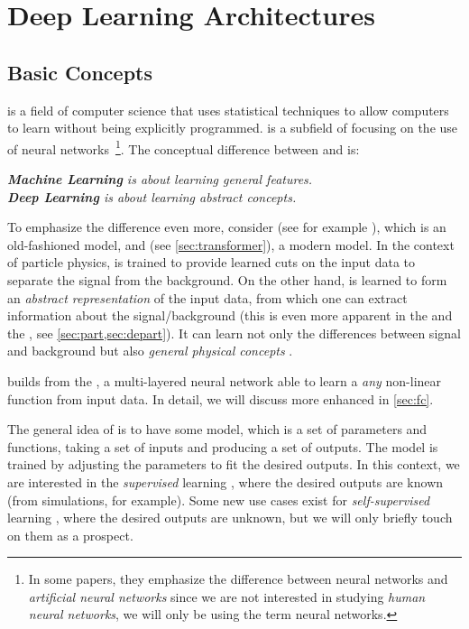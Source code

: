 \chapter{Deep Learning Architectures}
\label{ch:models}

\section{Basic Concepts}
\label{sec:basic_concepts}
\emph{\ml} is a field of computer science that uses statistical techniques to allow computers to learn without being explicitly programmed.
\emph{\dl} is a subfield of \ml focusing on the use of neural networks~\footnote{In some papers, they emphasize the difference between neural networks and \emph{artificial neural networks} since we are not interested in studying \emph{human neural networks}, we will only be using the term neural networks.}.
The conceptual difference between \ml and \dl is:
\begin{center}
    \emph{\textbf{Machine Learning} is about learning general features. \\ \textbf{Deep Learning} is about learning abstract concepts.}
\end{center}

To emphasize the difference even more, consider \bdt (see for example \cite{bdt}), which is an old-fashioned \ml model, and \trans (see \cref{sec:transformer}), a modern \dl model. 
In the context of particle physics, \bdt is trained to provide learned cuts on the input data to separate the signal from the background.
On the other hand, \trans is learned to form an \emph{abstract representation} of the input data, from which one can extract information about the signal/background (this is even more apparent in the \ParT and the \depart, see \cref{sec:part,sec:depart}).
It can learn not only the differences between signal and background but also \emph{general physical concepts} \cite{qcd_as_nlp}. 

\dl builds from the \mlp \cite{mlp}, a multi-layered neural network able to learn a \emph{any} non-linear function from input data.
In detail, we will discuss more enhanced \mlp in \cref{sec:fc}.

The general idea of \dl is to have some model, which is a set of parameters and functions, taking a set of inputs and producing a set of outputs.
The model is trained by adjusting the parameters to fit the desired outputs.
In this context, we are interested in the \emph{supervised} learning \cite{deeplearningbook}, where the desired outputs are known (from \MC simulations, for example).
Some new use cases exist for \emph{self-supervised} learning \cite{masked_autoencoders}, where the desired outputs are unknown, but we will only briefly touch on them as a prospect.


